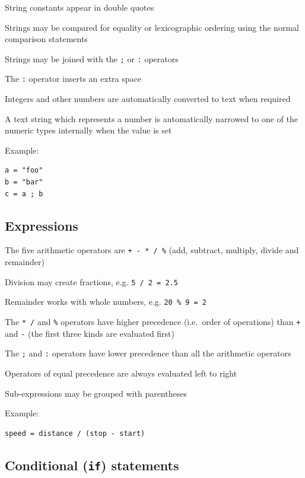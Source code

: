 \documentclass[12pt,a4paper,twoside]{article}
\renewcommand{\_}{\texttt{\symbol{95}}}
\begin{document}
\begin{bulletlist}
\item String constants appear in double quotes
\item Strings may be compared for equality or lexicographic ordering
	using the normal comparison statements
\item Strings may be joined with the \verb^;^ or \verb^:^ operators
\item The \verb^:^ operator inserts an extra space
\item Integers and other numbers are automatically converted to text
	when required
\item A text string which represents a number is automatically
	narrowed to one of the numeric types internally when the value is set
\end{bulletlist}

Example:
\begin{verbatim}
a = "foo"
b = "bar"
c = a ; b
\end{verbatim}

\subsection{Expressions}

\begin{bulletlist}
\item The five arithmetic operators are \verb^+ - * / %^ (add,
	subtract, multiply, divide and remainder)
\item Division may create fractions, e.g. \verb^5 / 2 = 2.5^
\item Remainder works with whole numbers, e.g. \verb^20 % 9 = 2^
\item The \verb^* /^ and \verb^%^ operators have higher precedence
                               (i.e.\ order of operations) than
	\verb^+^ and \verb^-^ (the first three kinds are evaluated first)
\item The \verb^;^ and \verb^:^ operators have lower precedence than
	all the arithmetic operators
\item Operators of equal precedence are always evaluated left to right
\item Sub-expressions may be grouped with parentheses
\end{bulletlist}

Example:
\begin{verbatim}
speed = distance / (stop - start)
\end{verbatim}

\subsection{Conditional (\texttt{if}) statements}
\end{document}
